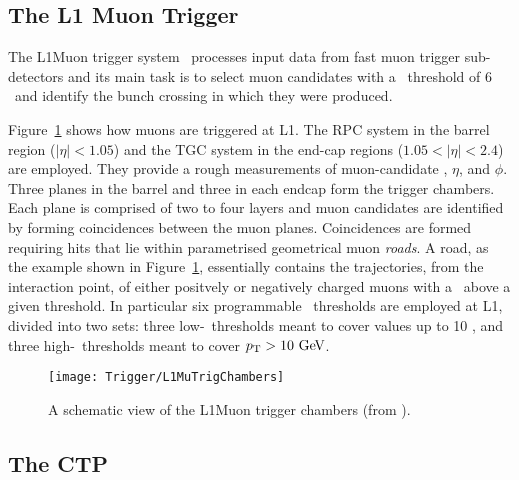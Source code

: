 		\subsection*{The L1 Muon Trigger}

			The \ac{L1Muon} trigger system~\cite{ATLASPerf08} processes input data from fast muon trigger sub-detectors and its main task is to select muon candidates with a \pt\ threshold of 6 \GeV\ and identify the bunch crossing in which they were produced.

			Figure~\ref{fig:L1MuTrig} shows how muons are triggered at \ac{L1}. The \ac{RPC} system in the barrel region ($\left | \eta \right | < 1.05$) and the TGC system in the end-cap regions ($1.05 < \left | \eta \right | < 2.4$) are employed. They provide a rough measurements of muon-candidate \pt, $\eta$, and $\phi$. Three planes in the barrel and three in each endcap form the trigger chambers. Each plane is comprised of two to four layers and muon candidates are identified by forming coincidences between the muon planes. Coincidences are formed requiring hits that lie within parametrised geometrical muon \emph{roads}. A road, as the example shown in Figure~\ref{fig:L1MuTrig}, essentially contains the trajectories, from the interaction point, of either positvely or negatively charged muons with a \pt\ above a given threshold. In particular six programmable \pt\ thresholds are employed at \ac{L1}, divided into two sets: three low-\pt\ thresholds meant to cover values up to 10 \GeV, and three high-\pt\ thresholds meant to cover $\pt > 10 \GeV$.

			\begin{figure}[!htb]
				\centering
				\texttt{[image: Trigger/L1MuTrigChambers]}
				\caption{\label{fig:L1MuTrig} A schematic view of the \ac{L1Muon} trigger chambers (from \cite{ATLASTrigger2010}).}
			\end{figure}


		\subsection*{The CTP}

